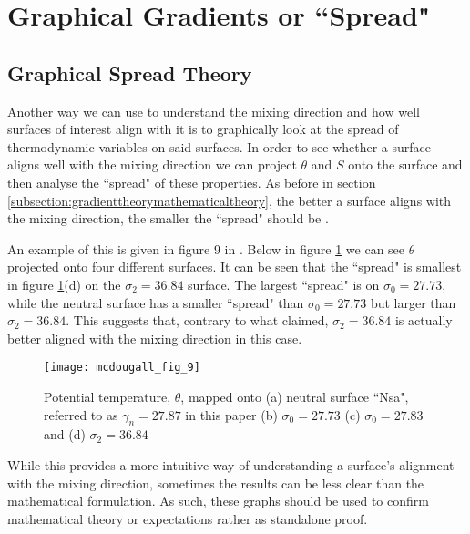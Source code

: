 \section{Graphical Gradients or ``Spread"}
\label{section:spread}

\subsection{Graphical Spread Theory}
\label{subsection:spreadtheory}

Another way we can use to understand the mixing direction and how well surfaces of interest align with it is to graphically look at the spread of thermodynamic variables on said surfaces.  In order to see whether a surface aligns well with the mixing direction we can project $\theta$ and $S$ onto the surface and then analyse the ``spread" of these properties. As before in section \ref{subsection:gradienttheorymathematicaltheory}, the better a surface aligns with the mixing direction, the smaller the ``spread" should be \citet{McDougall1987}. 

An example of this is given in figure 9 in \citet{McDougall1987}. Below in figure \ref{fig:theory_mcdougall_theta_spread} we can see $\theta$ projected onto four different surfaces. It can be seen that the ``spread" is smallest in figure \ref{fig:theory_mcdougall_theta_spread}(d) on the $\sigma_2 = 36.84$ surface. The largest ``spread" is on $\sigma_0 = 27.73$, while the neutral surface has a smaller ``spread" than $\sigma_0 = 27.73$ but larger than $\sigma_2 = 36.84$. This suggests that, contrary to what \citet{McDougall1987} claimed, $\sigma_2 = 36.84$ is actually better aligned with the mixing direction in this case. 

\begin{figure}[htbp]
    \centering
    \texttt{[image: mcdougall\_fig\_9]}
    \caption{Potential temperature, $\theta$, mapped onto (a) neutral surface ``Nsa", referred to as $\gamma_n = 27.87$ in this paper (b) $\sigma_0 = 27.73$ (c) $\sigma_0 = 27.83$ and (d) $\sigma_2 = 36.84$ \citep{McDougall1987}}
    \label{fig:theory_mcdougall_theta_spread}
\end{figure}

While this provides a more intuitive way of understanding a surface's alignment with the mixing direction, sometimes the results can be less clear than the mathematical formulation. As such, these graphs should be used to confirm mathematical theory or expectations rather as standalone proof. 



